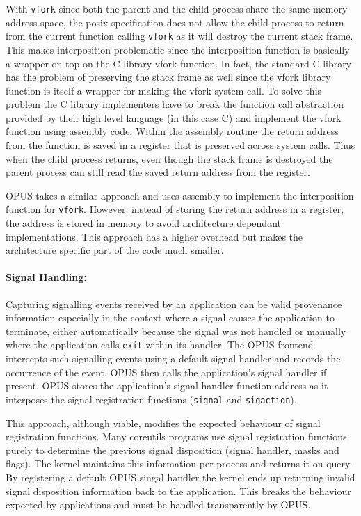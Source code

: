 \documentclass[withindex,glossary]{cam-thesis}
\begin{document}
With \texttt{vfork} since both the parent and the child process share the same memory address space, the posix specification does not allow the child process to return from the current function calling \texttt{vfork} as it will destroy the current stack frame.
This makes interposition problematic since the interposition function is basically a wrapper on top on the C library vfork function.
In fact, the standard C library has the problem of preserving the stack frame as well since the vfork library function is itself a wrapper for making the vfork system call.
To solve this problem the C library implementers have to break the function call abstraction provided by their high level language (in this case C) and implement the vfork function using assembly code.
Within the assembly routine the return address from the function is saved in a register that is preserved across system calls.
Thus when the child process returns, even though the stack frame is destroyed the parent process can still read the saved return address from the register.

OPUS takes a similar approach and uses assembly to implement the interposition function for \texttt{vfork}.
However, instead of storing the return address in a register, the address is stored in memory to avoid architecture dependant implementations.
This approach has a higher overhead but makes the architecture specific part of the code much smaller.

\paragraph{Signal Handling:}
Capturing signalling events received by an application can be valid provenance information especially in the context where a signal causes the application to terminate, either automatically because the signal was not handled or manually where the application calls \texttt{exit} within its handler.
The OPUS frontend intercepts such signalling events using a default signal handler and records the occurrence of the event.
OPUS then calls the application’s signal handler if present.
OPUS stores the application’s signal handler function address as it interposes the signal registration functions (\texttt{signal} and \texttt{sigaction}).

This approach, although viable, modifies the expected behaviour of signal registration functions.
Many coreutils programs use signal registration functions purely to determine the previous signal disposition (signal handler, masks and flags).
The kernel maintains this information per process and returns it on query.
By registering a default OPUS singal handler the kernel ends up returning invalid signal disposition information back to the application.
This breaks the behaviour expected by applications and must be handled transparently by OPUS.
\end{document}
